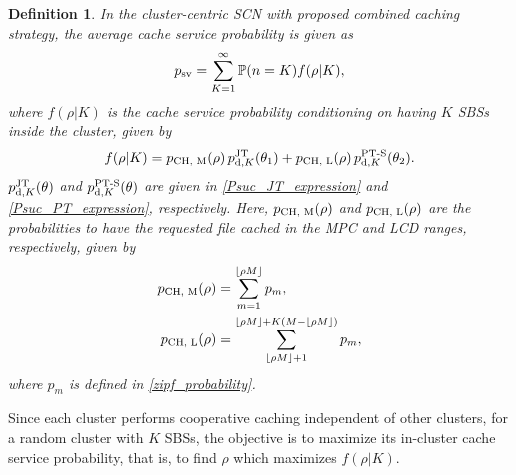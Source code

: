 \documentclass[twocolumns,10pt]{IEEEtran}
\newtheorem{definition}{Definition}
\begin{document}
\begin{definition}
	In the cluster-centric SCN with proposed combined caching strategy, the average cache service probability is given as
	\begin{equation}
	p_{\textnormal{sv}}=\sum\limits_{K=1}^{\infty} \mathbb{P}(n=K) f(\rho| K),
	\label{average_psv}
	\end{equation}
	where $f(\rho| K)$ is the cache service probability conditioning on having $K$ SBSs inside the cluster, given by 
	\begin{equation}
	f(\rho|K) = p_{\textnormal{CH, M}}(\rho)\, p_{\textnormal{d},K}^{\textnormal{JT}} (\theta_1) + p_{\textnormal{CH, L}}(\rho)\,  p_{\textnormal{d},K}^{\textnormal{PT-S}} (\theta_2).
	\label{objectif_function}
	\end{equation}
$p_{\textnormal{d},K}^{\textnormal{JT}} (\theta) $ and $ p_{\textnormal{d},K}^{\textnormal{PT-S}} (\theta)$ are given in \eqref{Psuc_JT_expression} and \eqref{Psuc_PT_expression}, respectively. 
Here, $p_{\textnormal{CH, M}}(\rho)$ and $p_{\textnormal{CH, L}}(\rho)$ are the probabilities to have the requested file cached in the MPC and LCD ranges, respectively, given by 
\begin{align}	
	p_{\textnormal{CH, M}}(\rho)& =\sum\limits_{m=1}^{\lfloor \rho M\rfloor } p_{m} \label{Cache_Prob_MPC},\\
	p_{\textnormal{CH, L}}(\rho)& =\sum\limits_{\lfloor \rho M\rfloor+1}^{\lfloor \rho M\rfloor+K(M-\lfloor \rho M\rfloor) } p_{m}, \label{Cache_Prob_LCD}
\end{align}
where $p_m$ is defined in \eqref{zipf_probability}.
\end{definition}

Since each cluster performs cooperative caching independent of other clusters, for a random cluster with $K$ SBSs, the objective is to maximize its in-cluster cache service probability, that is, to find $\rho$ which maximizes $f(\rho|K) $.
\end{document}
